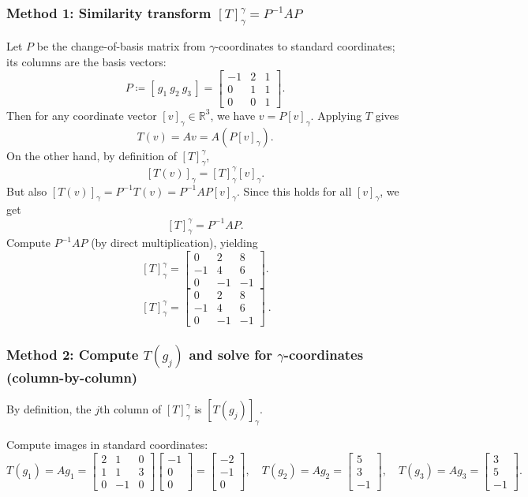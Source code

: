\documentclass[12pt]{article}
\newcommand{\R}{\mathbb{R}}
\begin{document}
\subsubsection{Method 1: Similarity transform $[T]_{\gamma}^{\gamma}=P^{-1}AP$}
Let $P$ be the change-of-basis matrix from $\gamma$-coordinates to standard coordinates; its columns are the basis vectors:
\[
P\coloneqq [\,g_1\ g_2\ g_3\,]=
\begin{bmatrix}
-1&2&1\\
0&1&1\\
0&0&1
\end{bmatrix}.
\]
Then for any coordinate vector $[v]_\gamma\in\R^3$, we have $v=P[v]_\gamma$.
Applying $T$ gives
\[
T(v)=Av=A(P[v]_\gamma).
\]
On the other hand, by definition of $[T]_\gamma^\gamma$,
\[
[T(v)]_\gamma = [T]_\gamma^\gamma [v]_\gamma.
\]
But also $[T(v)]_\gamma = P^{-1}T(v)=P^{-1}A P [v]_\gamma$. Since this holds for all $[v]_\gamma$, we get
\[
[T]_{\gamma}^{\gamma}=P^{-1} A P.
\]
Compute $P^{-1}AP$ (by direct multiplication), yielding
\[
[T]_{\gamma}^{\gamma}=
\begin{bmatrix}
0&2&8\\
-1&4&6\\
0&-1&-1
\end{bmatrix}.
\]
\[
\boxed{\ [T]_{\gamma}^{\gamma}=
\begin{bmatrix}
0&2&8\\
-1&4&6\\
0&-1&-1
\end{bmatrix}\ }.
\]

\subsubsection{Method 2: Compute $T(g_j)$ and solve for $\gamma$-coordinates (column-by-column)}
By definition, the $j$th column of $[T]_\gamma^\gamma$ is $[T(g_j)]_\gamma$.

Compute images in standard coordinates:
\[
T(g_1)=Ag_1=
\begin{bmatrix}
2&1&0\\
1&1&3\\
0&-1&0
\end{bmatrix}
\begin{bmatrix}-1\\0\\0\end{bmatrix}
=
\begin{bmatrix}-2\\-1\\0\end{bmatrix},
\quad
T(g_2)=Ag_2=
\begin{bmatrix}5\\3\\-1\end{bmatrix},
\quad
T(g_3)=Ag_3=
\begin{bmatrix}3\\5\\-1\end{bmatrix}.
\]
\end{document}
